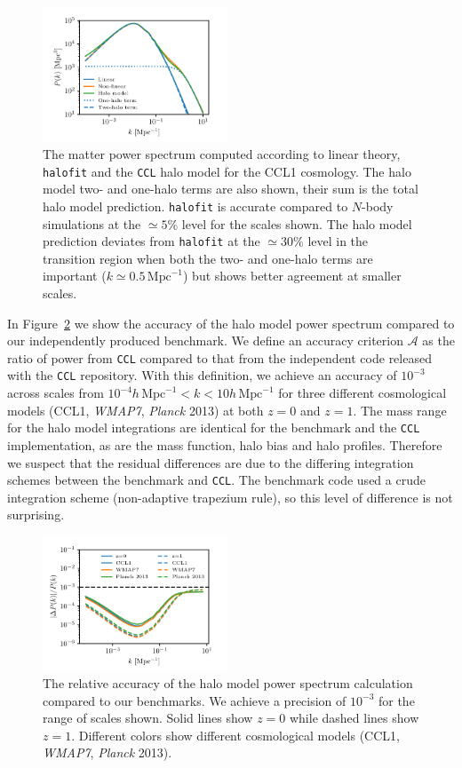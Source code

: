 \documentclass[\docopts]{\docclass}
\newcommand{\ccl}{{\tt CCL}\xspace}
\newcommand{\halofit}{{\tt halofit}\xspace}
\begin{document}
\begin{figure}
\includegraphics[width=0.49\textwidth]{halomodel}
\caption{The matter power spectrum computed according to linear theory, \halofit and the \ccl halo model for the CCL1 cosmology. The halo model two- and one-halo terms are also shown, their sum is the total halo model prediction. \halofit is accurate compared to $N$-body simulations at the $\simeq5\%$ level for the scales shown. The halo model prediction deviates from \halofit at the $\simeq30\%$ level in the transition region when both the two- and one-halo terms are important ($k\simeq0.5\,\mathrm{Mpc}^{-1}$) but shows better agreement at smaller scales.}
\label{fig:halo_model}
\end{figure}

In Figure~\ref{fig:halo_model_benchmark} we show the accuracy of the halo model power spectrum compared to our independently produced benchmark. We define an accuracy criterion $\mathcal{A}$ as the ratio of power from \ccl compared to that from the independent code released with the \ccl repository. With this definition, we achieve an accuracy of $10^{-3}$ across scales from $10^{-4}h\,\mathrm{Mpc}^{-1}<k<10h\,\mathrm{Mpc}^{-1}$ for three different cosmological models (CCL1, {\it WMAP7}, {\it Planck} 2013) at both $z=0$ and $z=1$. The mass range for the halo model integrations are identical for the benchmark and the \ccl implementation, as are the mass function, halo bias and halo profiles. Therefore we suspect that the residual differences are due to the differing integration schemes between the benchmark and \ccl. The benchmark code used a crude integration scheme (non-adaptive trapezium rule), so this level of difference is not surprising.

\begin{figure}
\includegraphics[width=0.49\textwidth]{halo_model_benchmark}
\caption{The relative accuracy of the halo model power spectrum calculation compared to our benchmarks. We achieve a precision of $10^{-3}$ for the range of scales shown. Solid lines show $z=0$ while dashed lines show $z=1$. Different colors show different cosmological models (CCL1, {\it WMAP7}, {\it Planck} 2013).}
\label{fig:halo_model_benchmark}
\end{figure}
\end{document}
